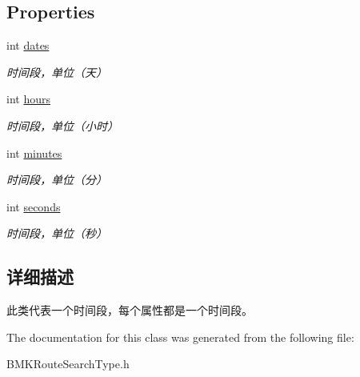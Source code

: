 \subsection*{Properties}
\begin{DoxyCompactItemize}
\item 
\hypertarget{interface_b_m_k_time_a24bb65125c9fd504229a04e616130cb1}{int \hyperlink{interface_b_m_k_time_a24bb65125c9fd504229a04e616130cb1}{dates}}\label{interface_b_m_k_time_a24bb65125c9fd504229a04e616130cb1}

\begin{DoxyCompactList}\small\item\em 时间段，单位（天） \end{DoxyCompactList}\item 
\hypertarget{interface_b_m_k_time_ae91ad4ffdcb6c8c42a5477199e4947f8}{int \hyperlink{interface_b_m_k_time_ae91ad4ffdcb6c8c42a5477199e4947f8}{hours}}\label{interface_b_m_k_time_ae91ad4ffdcb6c8c42a5477199e4947f8}

\begin{DoxyCompactList}\small\item\em 时间段，单位（小时） \end{DoxyCompactList}\item 
\hypertarget{interface_b_m_k_time_a8c39c525065b0fef0983a0feddae471d}{int \hyperlink{interface_b_m_k_time_a8c39c525065b0fef0983a0feddae471d}{minutes}}\label{interface_b_m_k_time_a8c39c525065b0fef0983a0feddae471d}

\begin{DoxyCompactList}\small\item\em 时间段，单位（分） \end{DoxyCompactList}\item 
\hypertarget{interface_b_m_k_time_a66d0a1c9418ef56ef10ad023513c0f95}{int \hyperlink{interface_b_m_k_time_a66d0a1c9418ef56ef10ad023513c0f95}{seconds}}\label{interface_b_m_k_time_a66d0a1c9418ef56ef10ad023513c0f95}

\begin{DoxyCompactList}\small\item\em 时间段，单位（秒） \end{DoxyCompactList}\end{DoxyCompactItemize}


\subsection{详细描述}
此类代表一个时间段，每个属性都是一个时间段。 

The documentation for this class was generated from the following file\-:\begin{DoxyCompactItemize}
\item 
B\-M\-K\-Route\-Search\-Type.\-h\end{DoxyCompactItemize}

